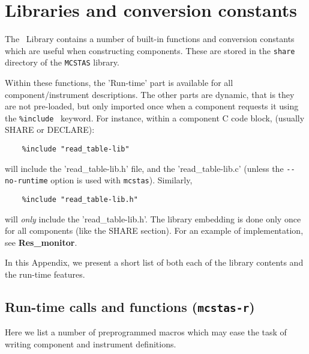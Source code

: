 
\chapter{Libraries and conversion constants}
\label{c:kernelcalls}

The \MCS\ Library contains a number of built-in functions
and conversion constants which are useful when constructing
components. These are stored in the \verb+share+ directory of
the \verb+MCSTAS+ library. 

Within these functions, the 'Run-time' part is available for all
component/instrument descriptions. The other parts
are dynamic, that is they are not
pre-loaded, but only imported once when a component requests it
using the \verb+%include+ \MCS\ keyword. For instance, within a
component C code block, (usually SHARE or DECLARE):
\begin{verbatim}
    %include "read_table-lib"
\end{verbatim}
will include the 'read\_table-lib.h' file, and the 'read\_table-lib.c'
(unless the \verb+--no-runtime+ option is used with \verb+mcstas+).
Similarly,
\begin{verbatim}
    %include "read_table-lib.h"
\end{verbatim}
will \emph{only} include the 'read\_table-lib.h'.
The library embedding is done only once for all components (like the
 SHARE section).  For an example
of implementation, see {\bf Res\_monitor}.

In this Appendix, we present a short list of both each of the library contents
and the run-time features.

\section{Run-time calls and functions (\texttt{mcstas-r})}
\label{s:calls:run-time}
Here we list a number of preprogrammed macros
which may ease the task of writing component and instrument definitions.

